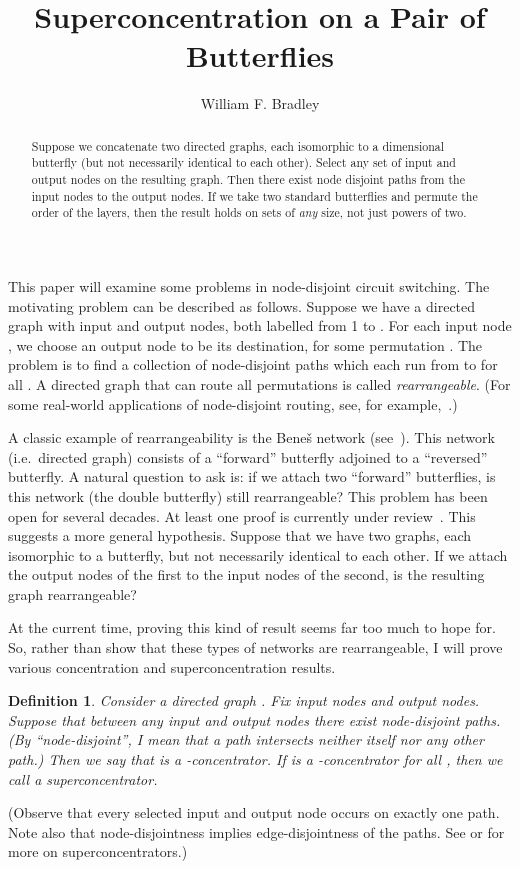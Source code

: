 \documentclass[12pt]{article}
\newtheorem{definition}{Definition}
\begin{document}
\title{Superconcentration on a Pair of Butterflies}
\author{William F. Bradley}
\maketitle



\begin{abstract}
 Suppose we concatenate two directed graphs, each isomorphic
  to a  dimensional butterfly (but not necessarily identical to
  each other). Select any set of  input and  output
  nodes on the resulting graph.  Then there exist node disjoint paths
  from the input nodes to the output nodes.  If we take two standard
  butterflies and permute the order of the layers, then the result
  holds on sets of \emph{any} size, not just powers of two.
\end{abstract}

This paper will examine some problems in node-disjoint circuit switching.
The motivating problem can be described as follows.  
Suppose we have a directed graph with  input
and  output nodes, both labelled from 1 to .  For each input node ,
we choose an output node  to be its destination, for some permutation
.  The problem is to find a collection of  node-disjoint paths 
which each run from  to  for all .  A directed graph that can
route all permutations  is called \emph{rearrangeable}.
(For some real-world applications of
node-disjoint routing, see, for example,~\cite{optical_networks}.)

A classic example of rearrangeability is the Bene\v{s} 
network (see~\cite{Leighton}).  
This network (i.e.\ directed graph) consists of a ``forward'' butterfly 
adjoined to a 
``reversed'' butterfly.  A natural question to ask is: if we attach 
two ``forward'' butterflies, is this network (the 
double butterfly) still rearrangeable?
This problem has been open for several decades.  At least one proof is 
currently under review~\cite{Cam}.  This suggests a more general
hypothesis.  Suppose that we have two graphs, each isomorphic to a
butterfly, but not necessarily identical to each other.  If we attach
the output nodes of the first to the input nodes of the second, is 
the resulting graph rearrangeable?

At the current time, proving this kind of result seems far too much to
hope for.  So, rather than show that these types of networks are rearrangeable,
I will prove various concentration and superconcentration results.
\begin{definition}
Consider a directed graph .  Fix  input nodes and  output nodes.
Suppose that between any  input and  output nodes there exist 
 node-disjoint paths.
(By ``node-disjoint'', I mean that a path intersects
neither itself nor any other path.)  Then we say that  is a
-concentrator.  If  is a -concentrator
for all , then we call  a \emph{superconcentrator}.
\end{definition}
(Observe that every selected input and output node occurs on exactly one 
path.  Note also that node-disjointness implies edge-disjointness of the paths.
See \cite{Pippenger} or \cite{Hwang} for more on superconcentrators.)
\end{document}
